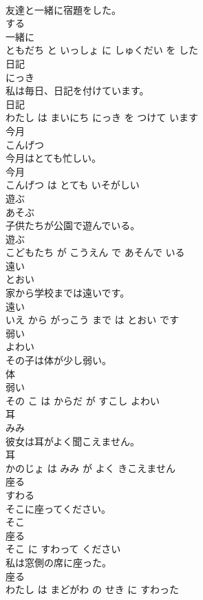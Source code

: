 \documentclass[8pt]{extreport}
\begin{document}
\begin{CJK}{UTF8}{min}
\\	友達と一緒に宿題をした。	
\\	する 
\\	一緒に 
\\	ともだち と いっしょ に しゅくだい を した			
\\	日記	
\\	にっき			
\\	私は毎日、日記を付けています。	
\\	日記 
\\	わたし は まいにち にっき を つけて います			
\\	今月	
\\	こんげつ			
\\	今月はとても忙しい。	
\\	今月 
\\	こんげつ は とても いそがしい			
\\	遊ぶ	
\\	あそぶ			
\\	子供たちが公園で遊んでいる。	
\\	遊ぶ 
\\	こどもたち が こうえん で あそんで いる			
\\	遠い	
\\	とおい			
\\	家から学校までは遠いです。	
\\	遠い 
\\	いえ から がっこう まで は とおい です			
\\	弱い	
\\	よわい			
\\	その子は体が少し弱い。	
\\	体 
\\	弱い 
\\	その こ は からだ が すこし よわい			
\\	耳	
\\	みみ			
\\	彼女は耳がよく聞こえません。	
\\	耳 
\\	かのじょ は みみ が よく きこえません			
\\	座る	
\\	すわる			
\\	そこに座ってください。	
\\	そこ 
\\	座る 
\\	そこ に すわって ください			
\\	私は窓側の席に座った。	
\\	座る 
\\	わたし は まどがわ の せき に すわった			

\end{CJK}
\end{document}
